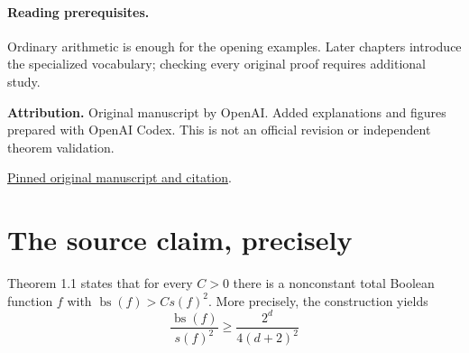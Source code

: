 \documentclass[11pt]{article}
\begin{document}
\paragraph{Reading prerequisites.} Ordinary arithmetic is enough for the opening examples. Later chapters introduce the specialized vocabulary; checking every original proof requires additional study.\par\textbf{Attribution.} Original manuscript by OpenAI. Added explanations and figures prepared with OpenAI Codex. This is not an official revision or independent theorem validation.\par\href{https://github.com/openai/math/tree/1581d4cbdd69a0faf34b2089614fe2a814316a6a/preprints/A-superquadratic-separation-between-sensitivity-and-block-sensitivity-September-25-2026}{Pinned original manuscript and citation}.\newpage\section*{The source claim, precisely}Theorem 1.1 states that for every $C>0$ there is a nonconstant total Boolean function $f$ with $\operatorname{bs}(f)>Cs(f)^2$. More precisely, the construction yields
\[\frac{\operatorname{bs}(f)}{s(f)^2}\ge\frac{2^d}{4(d+2)^2}\]
\end{document}
